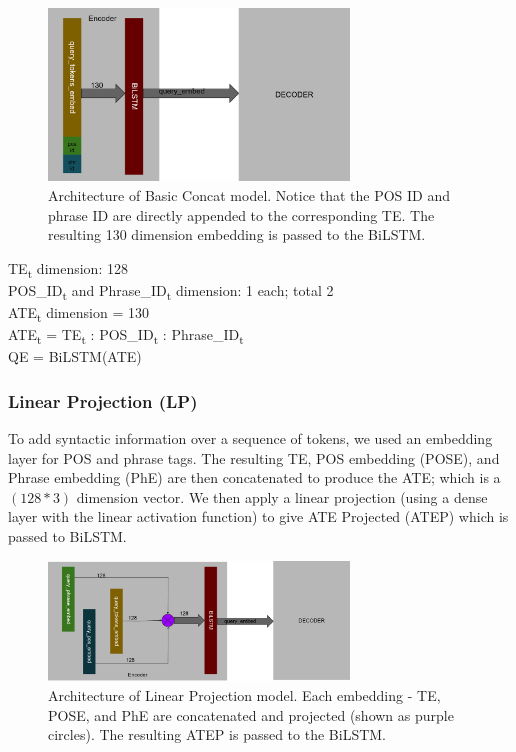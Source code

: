 \documentclass{IEEEtran}
\begin{document}
        \begin{figure}[h]
          \centering
          \includegraphics[width=8cm]{bc.png}
          \caption{Architecture of Basic Concat model. Notice that the POS ID and phrase ID
          are directly appended to the corresponding TE. The resulting 130 dimension embedding
          is passed to the BiLSTM.}
          \label{fig:bc}
        \end{figure}

        \hspace*{-3.5mm}TE\textsubscript{t} dimension: 128 \\
        POS\_ID\textsubscript{t} and Phrase\_ID\textsubscript{t} dimension: 1 each; total 2 \\
        ATE\textsubscript{t} dimension = 130 \\
        \hspace*{-3.5mm}ATE\textsubscript{t} = \lbrack TE\textsubscript{t} : 
        POS\_ID\textsubscript{t} : Phrase\_ID\textsubscript{t}\rbrack \\
        QE = BiLSTM(ATE) \\

        \subsubsection{Linear Projection (LP)}
        To add syntactic information over a sequence of tokens, we used an embedding layer for
        POS and phrase tags. The resulting TE, POS embedding (POSE), and Phrase embedding (PhE) are
        then concatenated to produce the ATE; which is a $ (128 * 3) $ dimension vector. We then
        apply a linear projection (using a dense layer with the linear activation function) to 
        give ATE Projected (ATEP) which is passed to BiLSTM. \\

        \begin{figure}[h]
          \centering
          \includegraphics[width=8cm]{lp.png}
          \caption{Architecture of Linear Projection model. Each embedding - TE, POSE, and PhE 
          are concatenated and projected (shown as purple circles). The resulting ATEP is passed
          to the BiLSTM.}
          \label{fig:lp}
        \end{figure}
\end{document}
